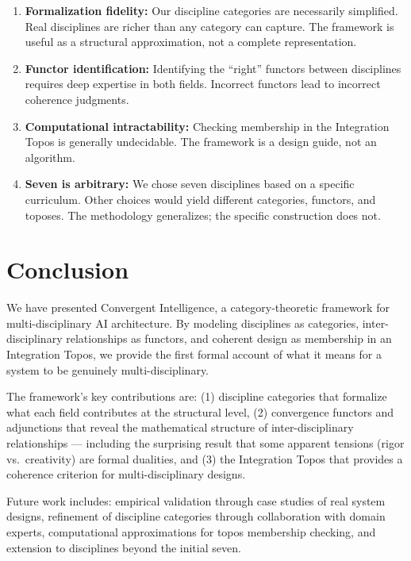 \documentclass[11pt,a4paper]{article}
\begin{document}
\begin{enumerate}
    \item \textbf{Formalization fidelity:} Our discipline categories are necessarily simplified. Real disciplines are richer than any category can capture. The framework is useful as a structural approximation, not a complete representation.
    \item \textbf{Functor identification:} Identifying the ``right'' functors between disciplines requires deep expertise in both fields. Incorrect functors lead to incorrect coherence judgments.
    \item \textbf{Computational intractability:} Checking membership in the Integration Topos is generally undecidable. The framework is a design guide, not an algorithm.
    \item \textbf{Seven is arbitrary:} We chose seven disciplines based on a specific curriculum. Other choices would yield different categories, functors, and toposes. The methodology generalizes; the specific construction does not.
\end{enumerate}

\section{Conclusion}

We have presented Convergent Intelligence, a category-theoretic framework for multi-disciplinary AI architecture. By modeling disciplines as categories, inter-disciplinary relationships as functors, and coherent design as membership in an Integration Topos, we provide the first formal account of what it means for a system to be genuinely multi-disciplinary.

The framework's key contributions are: (1) discipline categories that formalize what each field contributes at the structural level, (2) convergence functors and adjunctions that reveal the mathematical structure of inter-disciplinary relationships --- including the surprising result that some apparent tensions (rigor vs.\ creativity) are formal dualities, and (3) the Integration Topos that provides a coherence criterion for multi-disciplinary designs.

Future work includes: empirical validation through case studies of real system designs, refinement of discipline categories through collaboration with domain experts, computational approximations for topos membership checking, and extension to disciplines beyond the initial seven.
\end{document}
